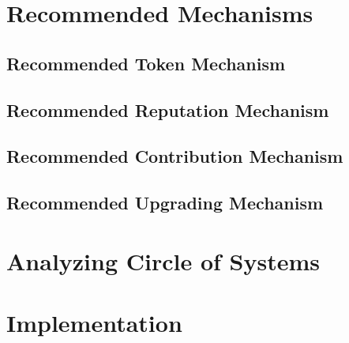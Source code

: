 \documentclass[10pt]{llncs}
\begin{document}
\section{Recommended Mechanisms}
\subsection{Recommended Token Mechanism}
\subsection{Recommended Reputation Mechanism}
\subsection{Recommended Contribution Mechanism}
\subsection{Recommended Upgrading Mechanism}
\section{Analyzing Circle of Systems}
\section{Implementation}


\end{document}
